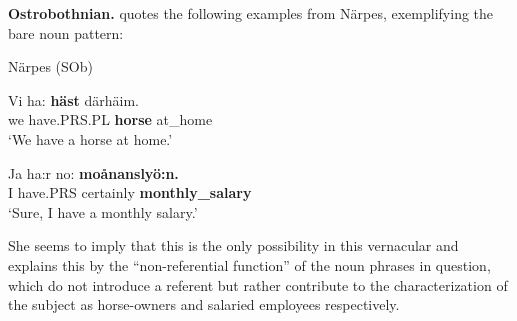
\textbf{Ostrobothnian.} \citet[207]{Nikula1997} quotes the following examples from Närpes, exemplifying the bare noun pattern:


\item 

Närpes (SOb) 



\item 


 \ea\label{}
\gll Vi  ha:  \textbf{häst} därhäim.\\


we  have.PRS.PL  \textbf{horse} at\_home\\

\glt ‘We have a horse at home.’

\z

\item 


 \ea\label{}
\gll Ja  ha:r  no:  \textbf{moånanslyö:n.}\\


I  have.PRS  certainly  \textbf{monthly\_salary}\\

\glt ‘Sure, I have a monthly salary.’

\z

She seems to imply that this is the only possibility in this vernacular and explains this by the “non-referential function” of the noun phrases in question, which do not introduce a referent but rather contribute to the characterization of the subject as horse-owners and salaried employees respectively. 


